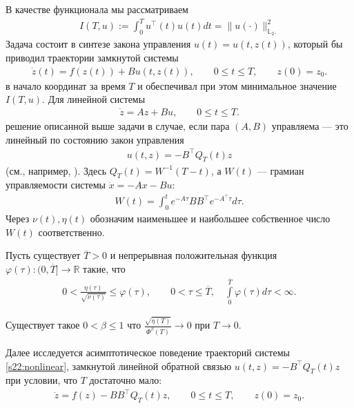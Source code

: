 \documentclass[../abstract.tex]{subfiles}
\begin{document}
В качестве функционала мы рассматриваем 
\begin{gather}\label{s22:cost}
	I(T,u):=\int_0^Tu^\top (t)u(t)dt= \lVert u(\cdot)\rVert^2_{\mathbb{L}_2.} 
\end{gather}
Задача состоит в синтезе закона управления $u(t)=u(t,z(t))$, который бы приводил траектории замкнутой системы 
\begin{gather*}
	\dot{z}(t)=f(z(t))+B u(t,z(t)),\qquad 0 \leqslant t \leqslant T, \qquad z(0) = z_0.
\end{gather*}
в начало координат за время $T$ и обеспечивал при этом минимальное значение $I(T,u)$. 
Для линейной системы 
\begin{gather}\label{s22:linear}
	\dot{z} = A z + B u, \qquad 0 \leqslant t \leqslant T.
\end{gather}
решение описанной выше задачи в случае, если пара $(A,B)$ управляема --- это линейный по состоянию закон управления
\begin{gather}\label{s22:linear_feedback}
	u(t,z) = -B^{\top} Q_T(t) z
\end{gather}
(см., например, \cite{Abgar,Kur1,GusevOsipov}).
Здесь $Q_T(t)=W^{-1}(T-t)$, а $W(t)$ --- грамиан управляемости системы $\dot{x} = -A x - B u$:
\begin{gather*}
	W(t) = \int_0^t e^{-A\tau}BB^\top e^{-A^{\top}\tau}d\tau. 
\end{gather*}
Через $\nu(t), \eta(t)$ обозначим наименьшее и наибольшее собственное число $W(t)$ соответственно. 
\begin{assumption} \label{s22:asm1} 
	Пусть существует $\overline{T}>0$ и непрерывная положительная функция $\varphi(\tau): (0, \overline{T}] \to \mathbb{R}$ такие, что
	\begin{gather*}
		0 < \frac{\eta(\tau)}{\sqrt{\nu(\tau)}} \leqslant \varphi(\tau), \qquad 0 < \tau \leqslant \overline{T},\quad \int\limits_0^ {\overline{T}}\varphi(\tau) d\tau<\infty.
	\end{gather*} 
\end{assumption}
\begin{assumption}\label{s22:asm2}
	Существует такое $ 0 < \beta \leqslant 1$ что $\frac{\sqrt{\eta(T)}}{\Phi^\beta(T)} \to 0$ при $T \to 0$.
\end{assumption}

Далее исследуется асимптотическое поведение траекторий системы \eqref{s22:nonlinear}, замкнутой линейной обратной связью $ u(t,z) = -B^{\top} Q_T(t) z$ при условии, что $T$ достаточно мало:
\begin{gather}\label{s22:nonlinear_closed}
	\dot{z} = f(z) - B B^{\top} Q_T(t) z, \qquad 0 \leqslant t \leqslant T, \qquad z(0) = z_0.
\end{gather}
\end{document}
